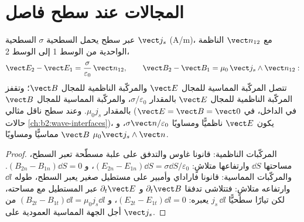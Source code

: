 \section{المجالات عند سطح فاصل}

\begin{proposition}\label{prop:b2:maxwell-equations:boundary}
عبر سطح يحمل  السطحية $\sigma$  السطحية $\vect j_s$ (\unit{A/m})، مع $\vect n_{12}$ الناظمة
الواحدية من الوسط 1 إلى الوسط 2،
\[
\vect E_2 - \vect E_1 = \frac\sigma{\varepsilon_0}\,\vect n_{12} , \qquad
\vect B_2 - \vect B_1 = \mu_0\,\vect j_s\wedge\vect n_{12} :
\]
تتصل المركّبة المماسية للمجال $\vect E$ والمركّبة الناظمية للمجال $\vect B$؛
وتقفز المركّبة الناظمية للمجال $\vect E$ بالمقدار $\sigma/\varepsilon_0$،
والمركّبة المماسية للمجال $\vect B$ بالمقدار $\mu_0j_s$. وعند سطح ناقل
مثالي ($\vect E = \vect B = \vect 0$ في الداخل، في حالات
\cref{ch:b2:wave-interfaces})، يكون $\vect E$ ناظميًّا ومساويًا $\sigma\vect n/
\varepsilon_0$، و $\vect B$ مماسيًّا ومساويًا $\mu_0\vect j_s\wedge\vect n$.
\end{proposition}

\begin{proof}
المركّبات الناظمية: قانونا غاوس والتدفق على علبة مسطّحة
تعبر السطح، مساحتها $\dd S$ وارتفاعها متلاشٍ: $(E_{2n}
- E_{1n})\dd S = \sigma\dd S/\varepsilon_0$، و $(B_{2n} - B_{1n})\dd S = 0$. والمركّبات
المماسية: قانونا فاراداي وأمبير على مستطيل صغير
يعبر السطح، طوله $\dd l$ وارتفاعه متلاشٍ: فتتلاشى
تدفقا $\partial_t\vect B$ و $\partial_t\vect E$ عبر المستطيل
مع مساحته، لكن تيارًا سطحيًّا $j_s\,\dd l$ يعبره:
$(E_{2t} - E_{1t})\dd l = 0$، و $(B_{2t} - B_{1t})\dd l = \mu_0j_s\dd l$ من أجل
الجهة المماسية العمودية على $\vect j_s$.
\end{proof}

